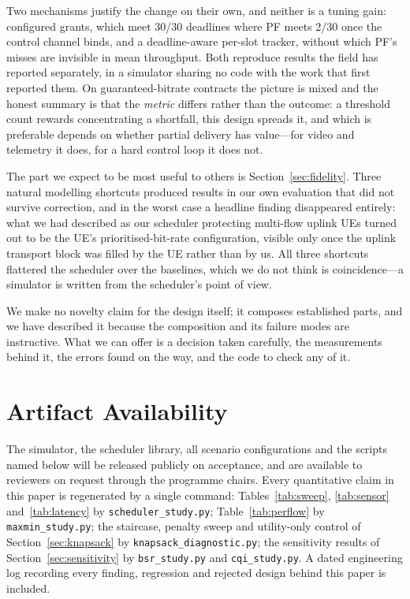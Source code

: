 \documentclass[conference]{IEEEtran}
\begin{document}
Two mechanisms justify the change on their own, and neither is a tuning
gain: configured grants, which meet 30/30 deadlines where PF meets 2/30 once
the control channel binds, and a deadline-aware per-slot tracker, without
which PF's misses are invisible in mean throughput. Both reproduce results
the field has reported separately, in a simulator sharing no code with the
work that first reported them. On guaranteed-bitrate contracts the picture is
mixed and the honest summary is that the \emph{metric} differs rather than
the outcome: a threshold count rewards concentrating a shortfall, this design
spreads it, and which is preferable depends on whether partial delivery has
value---for video and telemetry it does, for a hard control loop it does not.

The part we expect to be most useful to others is Section~\ref{sec:fidelity}.
Three natural modelling shortcuts produced results in our own evaluation that
did not survive correction, and in the worst case a headline finding
disappeared entirely: what we had described as our scheduler protecting
multi-flow uplink UEs turned out to be the UE's prioritised-bit-rate
configuration, visible only once the uplink transport block was filled by the
UE rather than by us. All three shortcuts flattered the scheduler over the
baselines, which we do not think is coincidence---a simulator is written from
the scheduler's point of view.

We make no novelty claim for the design itself; it composes established
parts, and we have described it because the composition and its failure modes
are instructive. What we can offer is a decision taken carefully, the
measurements behind it, the errors found on the way, and the code to check
any of it.

\section*{Artifact Availability}
The simulator, the scheduler library, all scenario configurations and the
scripts named below will be released publicly on acceptance, and are
available to reviewers on request through the programme chairs. Every
quantitative claim in this paper is regenerated by a single command:
Tables~\ref{tab:sweep}, \ref{tab:sensor} and~\ref{tab:latency} by
\texttt{scheduler\_study.py}; Table~\ref{tab:perflow} by
\texttt{maxmin\_study.py}; the staircase, penalty sweep and utility-only
control of Section~\ref{sec:knapsack} by \texttt{knapsack\_diagnostic.py}; the sensitivity results of
Section~\ref{sec:sensitivity} by \texttt{bsr\_study.py} and
\texttt{cqi\_study.py}. A dated engineering log recording every finding,
regression and rejected design behind this paper is included.



\end{document}
